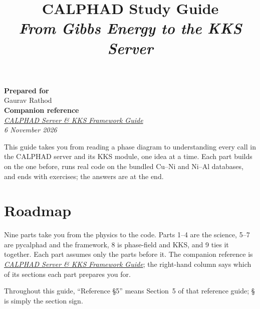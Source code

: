 \documentclass[12pt,a4paper]{article}
\title{\textbf{CALPHAD Study Guide} \\ \vspace{0.3cm} \textit{From Gibbs Energy to the KKS Server} \\}
\author{}
\date{}
\begin{document}
\maketitle
\vspace{-1.5cm}
\begin{center}
    \large{\textbf{Prepared for} \\ Gaurav Rathod \\}
    \vspace{1cm}
    \large{\textbf{Companion reference} \\ \href{https://claude.ai/artifact/DYaPx84Vvd9nVVGhyTVKLF}{\textit{CALPHAD Server \& KKS Framework Guide}} \\}
    \vspace{1cm}
    \textit{6 November 2026} \\
\end{center}

\pagebreak
\tableofcontents

\newpage
{}

This guide takes you from reading a phase diagram to understanding every call in the CALPHAD server and its KKS module, one idea at a time. Each part builds on the one before, runs real code on the bundled Cu--Ni and Ni--Al databases, and ends with exercises; the answers are at the end.


\section*{Roadmap}
Nine parts take you from the physics to the code. Parts 1--4 are the science, 5--7 are pycalphad and the framework, 8 is phase-field and KKS, and 9 ties it together. Each part assumes only the parts before it. The companion reference is \href{https://claude.ai/artifact/DYaPx84Vvd9nVVGhyTVKLF}{\textit{CALPHAD Server \& KKS Framework Guide}}; the right-hand column says which of its sections each part prepares you for.

Throughout this guide, ``Reference \S5'' means Section~5 of that reference guide; \S{} is simply the section sign.
\end{document}
